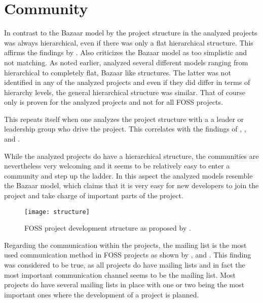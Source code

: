 
\section{Community} %

In contrast to the Bazaar model by \textcite{Raymond1998} the project structure
in the analyzed projects was always hierarchical, even if there was only a flat
hierarchical structure. This affirms the findings by \textcite{Crowston2005}.
Also \textcite{Bezroukov1999,Bezroukov1999a} criticizes the Bazaar model as too
simplistic and not matching. As noted earlier, \textcite{Ghosh2005} analyzed
several different models ranging from hierarchical to completely flat, Bazaar
like structures. The latter was not identified in any of the analyzed projects
and even if they did differ in terms of hierarchy levels, the general
hierarchical structure was similar. That of course only is proven for the
analyzed projects and not for all \ac{FOSS} projects.

This repeats itself when one analyzes the project structure with a a leader or
leadership group who drive the project. This correlates with the findings of
\textcite{Johnson2001}, \textcite{Crowston2005a}, \textcite{Warsta2003} and
\textcite{Krishnamurthy2002}.

While the analyzed projects do have a hierarchical structure, the communities
are nevertheless very welcoming and it seems to be relatively easy to enter a
community and step up the ladder. In this aspect the analyzed models resemble
the Bazaar model, which claims that it is very easy for new developers to join
the project and take charge of important parts of the project.

\begin{figure}[htbp]
  \centering
  \texttt{[image: structure]}
  \caption[\acl{FOSS} Project Development Structure]
  {\acl{FOSS} project development structure as proposed by \textcite{Crowston2005}.}
\end{figure}

Regarding the communication within the projects, the mailing list is the most
used communication method in \ac{FOSS} projects as shown by
\textcite{Schweik2003}, \textcite{Ogawa2007} and \textcite{Kim2003}. This
finding was considered to be true, as all projects do have mailing lists and in
fact the most important communication channel seems to be the mailing list.
Most projects do have several mailing lists in place with one or two being the
most important ones where the development of a project is planned.

